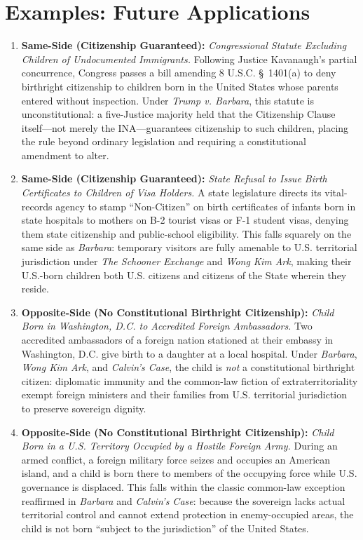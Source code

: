 \documentclass[12pt]{article}
\begin{document}
\section{Examples: Future Applications}
\begin{enumerate}
\item \textbf{Same-Side (Citizenship Guaranteed):} \textit{Congressional Statute Excluding Children of Undocumented Immigrants.} Following Justice Kavanaugh's partial concurrence, Congress passes a bill amending 8 U.S.C. \S\ 1401(a) to deny birthright citizenship to children born in the United States whose parents entered without inspection. Under \textit{Trump v. Barbara}, this statute is unconstitutional: a five-Justice majority held that the Citizenship Clause itself---not merely the INA---guarantees citizenship to such children, placing the rule beyond ordinary legislation and requiring a constitutional amendment to alter.
\item \textbf{Same-Side (Citizenship Guaranteed):} \textit{State Refusal to Issue Birth Certificates to Children of Visa Holders.} A state legislature directs its vital-records agency to stamp ``Non-Citizen'' on birth certificates of infants born in state hospitals to mothers on B-2 tourist visas or F-1 student visas, denying them state citizenship and public-school eligibility. This falls squarely on the same side as \textit{Barbara}: temporary visitors are fully amenable to U.S. territorial jurisdiction under \textit{The Schooner Exchange} and \textit{Wong Kim Ark}, making their U.S.-born children both U.S. citizens and citizens of the State wherein they reside.
\item \textbf{Opposite-Side (No Constitutional Birthright Citizenship):} \textit{Child Born in Washington, D.C. to Accredited Foreign Ambassadors.} Two accredited ambassadors of a foreign nation stationed at their embassy in Washington, D.C. give birth to a daughter at a local hospital. Under \textit{Barbara}, \textit{Wong Kim Ark}, and \textit{Calvin's Case}, the child is \textit{not} a constitutional birthright citizen: diplomatic immunity and the common-law fiction of extraterritoriality exempt foreign ministers and their families from U.S. territorial jurisdiction to preserve sovereign dignity.
\item \textbf{Opposite-Side (No Constitutional Birthright Citizenship):} \textit{Child Born in a U.S. Territory Occupied by a Hostile Foreign Army.} During an armed conflict, a foreign military force seizes and occupies an American island, and a child is born there to members of the occupying force while U.S. governance is displaced. This falls within the classic common-law exception reaffirmed in \textit{Barbara} and \textit{Calvin's Case}: because the sovereign lacks actual territorial control and cannot extend protection in enemy-occupied areas, the child is not born ``subject to the jurisdiction'' of the United States.

\end{enumerate}
\end{document}
